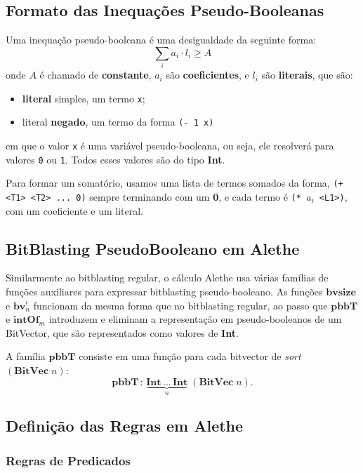 \documentclass[conference]{IEEEtran}
\begin{document}
\subsection{Formato das Inequações Pseudo-Booleanas}
Uma inequação pseudo-booleana é uma desigualdade da seguinte forma:
\[
    \sum_i a_i \cdot l_i \geq A
\]
onde $A$ é chamado de \textbf{constante}, $a_i$ são \textbf{coeficientes},
e $l_i$ são \textbf{literais}, que são:
\begin{itemize}
    \item \textbf{literal} simples, um termo \texttt{x};
    \item literal \textbf{negado}, um termo da forma \texttt{(- 1 x)}
\end{itemize}

em que o valor \texttt{x} é uma variável pseudo-booleana, ou seja, ele resolverá para valores
\texttt{0} ou \texttt{1}. Todos esses valores são do tipo \textbf{Int}.

Para formar um somatório, usamos uma lista de termos somados da forma,
\texttt{(+ <T1> <T2> ... 0)} sempre terminando com um \textbf{0}, e cada termo é
\texttt{(* $a_i$ <L1>)}, com um coeficiente e um literal.

\subsection{BitBlasting PseudoBooleano em Alethe}
Similarmente ao bitblasting regular, o cálculo Alethe usa várias famílias de funções auxiliares
para expressar bitblasting pseudo-booleano.
As funções $\textbf{bvsize}$ e $\textbf{bv}_n^i$ funcionam da mesma forma que no bitblasting regular,
ao passo que $\textbf{pbbT}$ e $\textbf{intOf}_m$ introduzem e eliminam a representação em
pseudo-booleanos de um BitVector, que são representados como valores de \textbf{Int}.

A família $\textbf{pbbT}$ consiste em uma função para cada bitvector de \textit{sort} $(\textbf{BitVec}\;n)$:
\[
    \textbf{pbbT}\,:\,\underbrace{\textbf{Int}\,\dots\,\textbf{Int}}_n\;(\textbf{BitVec}\;n).
\]

\subsection{Definição das Regras em Alethe}
\subsubsection{Regras de Predicados}
\end{document}
